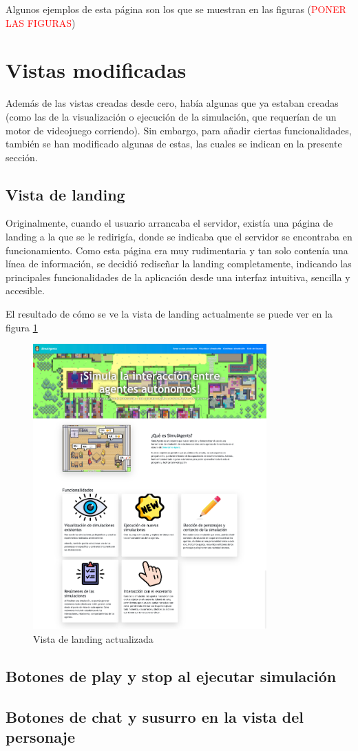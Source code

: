 Algunos ejemplos de esta página son los que se muestran en las figuras (\textcolor{red}{PONER LAS FIGURAS})

\section{Vistas modificadas}

Además de las vistas creadas desde cero, había algunas que ya estaban creadas (como las de la visualización o ejecución de la simulación, que requerían de un motor de videojuego corriendo). Sin embargo, para añadir ciertas funcionalidades, también se han modificado algunas de estas, las cuales se indican en la presente sección.

\subsection{Vista de landing}

Originalmente, cuando el usuario arrancaba el servidor, existía una página de landing a la que se le redirigía, donde se indicaba que el servidor se encontraba en funcionamiento. Como esta página era muy rudimentaria y tan solo contenía una línea de información, se decidió rediseñar la landing completamente, indicando las principales funcionalidades de la aplicación desde una interfaz intuitiva, sencilla y accesible.

El resultado de cómo se ve la vista de landing actualmente se puede ver en la figura \ref{fig:landing}

\begin{figure}[h]
	\centering
	\includegraphics[width = 0.8\textwidth]{Imagenes/Vectorial/landing.png}
	\caption{Vista de landing actualizada}
	\label{fig:landing}
\end{figure}

\subsection{Botones de play y stop al ejecutar simulación}

\subsection{Botones de chat y susurro en la vista del personaje}
